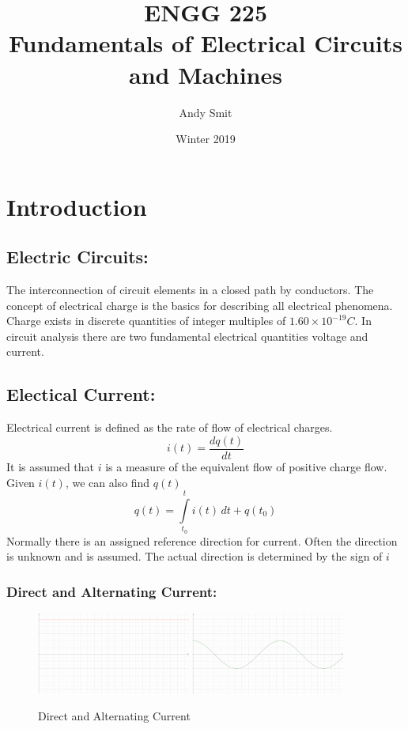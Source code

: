 \documentclass[14pt]{article}
\author{Andy Smit}
\title{ENGG 225\\Fundamentals of Electrical Circuits and Machines}
\date{Winter 2019}
\begin{document}
    \maketitle
    \section{Introduction}
    \subsection{Electric Circuits:}
    The interconnection of circuit elements in a closed path by
    conductors. The concept of electrical charge is the basics for
    describing all electrical phenomena. Charge exists in discrete
    quantities of integer multiples of $1.60\times 10^{-19}C$. In
    circuit analysis there are two fundamental electrical quantities
    voltage and current. 
    \subsection{Electical Current:}
    Electrical current is defined as the rate of flow of electrical
    charges.
    $$i(t)=\frac{d q(t)}{dt}$$ It is assumed that $i$ is a measure of
    the equivalent flow of positive charge flow. Given $i(t)$, we can
    also find $q(t)$
    $$q(t)=\int\limits_{t_0}^t i(t)\, dt+q(t_0)$$ Normally there is an
    assigned reference direction for current. Often the direction is
    unknown and is assumed. The actual direction is determined by the
    sign of $i$
    \subsubsection{Direct and Alternating Current:}
    \begin{figure}[h]
        \includegraphics[width=0.45\textwidth]{DirCur.eps}
        \hspace{0.09\textwidth}
        \includegraphics[width=0.45\textwidth]{AltCur.eps}
        \caption{Direct and Alternating Current}
    \end{figure}
\end{document}
